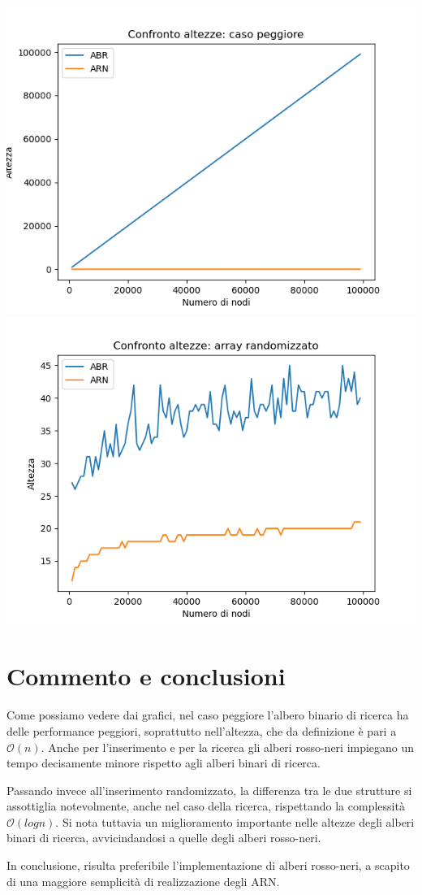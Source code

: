\documentclass[
]{article}
\begin{document}
\includegraphics{../../img/w_case/h.png}
\includegraphics{../../img/rand/h.png}

\hypertarget{commento-e-conclusioni}{%
\section{Commento e conclusioni}\label{commento-e-conclusioni}}

Come possiamo vedere dai grafici, nel caso peggiore l'albero binario di
ricerca ha delle performance peggiori, soprattutto nell'altezza, che da
definizione è pari a \(\mathcal{O}(n)\). Anche per l'inserimento e per
la ricerca gli alberi rosso-neri impiegano un tempo decisamente minore
rispetto agli alberi binari di ricerca.

Passando invece all'inserimento randomizzato, la differenza tra le due
strutture si assottiglia notevolmente, anche nel caso della ricerca,
rispettando la complessità \(\mathcal{O}(logn)\). Si nota tuttavia un
miglioramento importante nelle altezze degli alberi binari di ricerca,
avvicindandosi a quelle degli alberi rosso-neri.

In conclusione, risulta preferibile l'implementazione di alberi
rosso-neri, a scapito di una maggiore semplicità di realizzazione degli
ARN.
\end{document}
